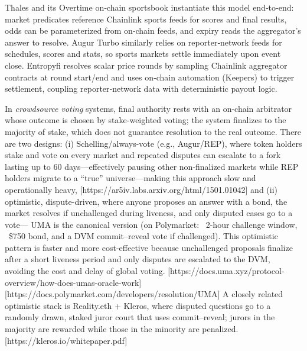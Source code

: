 Thales and its Overtime on‑chain sportsbook instantiate this model end‑to‑end: market predicates reference Chainlink sports feeds for scores and final results, odds can be parameterized from on‑chain feeds, and expiry reads the aggregator’s answer to resolve. Augur Turbo similarly relies on reporter‑network feeds for schedules, scores and stats, so sports markets settle immediately upon event close. Entropyfi resolves scalar price rounds by sampling Chainlink aggregator contracts at round start/end and uses on‑chain automation (Keepers) to trigger settlement, coupling reporter‑network data with deterministic payout logic. 





In \textit{crowdsource voting} systems, final authority rests with an on-chain arbitrator whose outcome is chosen by stake-weighted voting; the system finalizes to the majority of stake, which does not guarantee resolution to the real outcome. There are two designs: (i) Schelling/always-vote (e.g., Augur/REP), where token holders stake and vote on every market and repeated disputes can escalate to a fork lasting up to 60 days—effectively pausing other non-finalized markets while REP holders migrate to a “true” universe—making this approach slow and operationally heavy, [https://ar5iv.labs.arxiv.org/html/1501.01042] and (ii) optimistic, dispute-driven, where anyone proposes an answer with a bond, the market resolves if unchallenged during liveness, and only disputed cases go to a vote— UMA is the canonical version (on Polymarket: ~2-hour challenge window, ~\$750 bond, and a DVM commit–reveal vote if challenged). This optimistic pattern is faster and more cost-effective because unchallenged proposals finalize after a short liveness period and only disputes are escalated to the DVM, avoiding the cost and delay of global voting.
[https://docs.uma.xyz/protocol-overview/how-does-umas-oracle-work]
[https://docs.polymarket.com/developers/resolution/UMA]
A closely related optimistic stack is Reality.eth + Kleros, where disputed questions go to a randomly drawn, staked juror court that uses commit–reveal; jurors in the majority are rewarded while those in the minority are penalized. [https://kleros.io/whitepaper.pdf]
